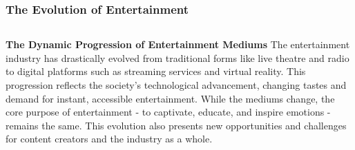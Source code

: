 \documentclass[5pt]{beamer}
\begin{document}
\begin{frame}
\frametitle{The Evolution of Entertainment}
\begin{columns}
\begin{column}{0.7\textwidth}
\begin{block}{\textbf{The Dynamic Progression of Entertainment Mediums}}
The entertainment industry has drastically evolved from traditional forms like live theatre and radio to digital platforms such as streaming services and virtual reality. This progression reflects the society's technological advancement, changing tastes and demand for instant, accessible entertainment. While the mediums change, the core purpose of entertainment - to captivate, educate, and inspire emotions - remains the same. This evolution also presents new opportunities and challenges for content creators and the industry as a whole.
\end{block}
\end{column}
\end{columns}
\end{frame}
\end{document}
